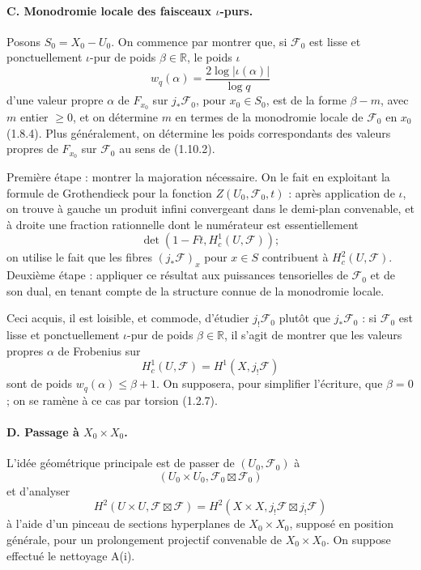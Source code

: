 \documentclass[11pt]{article}
\theoremstyle{remark}
\begin{document}
\paragraph{C. Monodromie locale des faisceaux $\iota$-purs.}
Posons $S_0=X_0-U_0$. On commence par montrer que, si $\mathcal F_0$ est lisse et ponctuellement $\iota$-pur de poids $\beta\in\mathbb R$, le poids $\iota$
\[
w_q(\alpha)=\frac{2\log |\iota(\alpha)|}{\log q}
\]
d'une valeur propre $\alpha$ de $F_{x_0}$ sur $j_*\mathcal F_0$, pour $x_0\in S_0$, est de la forme $\beta-m$, avec $m$ entier $\ge 0$, et on détermine $m$ en termes de la monodromie locale de $\mathcal F_0$ en $x_0$ (1.8.4). Plus généralement, on détermine les poids correspondants des valeurs propres de $F_{x_0}$ sur $\mathcal F_0$ au sens de (1.10.2).

Première étape : montrer la majoration nécessaire. On le fait en exploitant la formule de Grothendieck pour la fonction $Z(U_0,\mathcal F_0,t)$ : après application de $\iota$, on trouve à gauche un produit infini convergeant dans le demi-plan convenable, et à droite une fraction rationnelle dont le numérateur est essentiellement
\[
\det(1-Ft,H^1_c(U,\mathcal F));
\]
on utilise le fait que les fibres $(j_*\mathcal F)_x$ pour $x\in S$ contribuent à $H^2_c(U,\mathcal F)$. Deuxième étape : appliquer ce résultat aux puissances tensorielles de $\mathcal F_0$ et de son dual, en tenant compte de la structure connue de la monodromie locale.

Ceci acquis, il est loisible, et commode, d'étudier $j_!\mathcal F_0$ plutôt que $j_*\mathcal F_0$ : si $\mathcal F_0$ est lisse et ponctuellement $\iota$-pur de poids $\beta\in\mathbb R$, il s'agit de montrer que les valeurs propres $\alpha$ de Frobenius sur
\[
H^1_c(U,\mathcal F)=H^1(X,j_!\mathcal F)
\]
sont de poids $w_q(\alpha)\le \beta+1$. On supposera, pour simplifier l'écriture, que $\beta=0$; on se ramène à ce cas par torsion (1.2.7).

\paragraph{D. Passage à $X_0\times X_0$.}
L'idée géométrique principale est de passer de $(U_0,\mathcal F_0)$ à
\[
(U_0\times U_0,\mathcal F_0\boxtimes\mathcal F_0)
\]
et d'analyser
\[
H^2(U\times U,\mathcal F\boxtimes\mathcal F)
  = H^2(X\times X,j_!\mathcal F\boxtimes j_!\mathcal F)
\]
à l'aide d'un pinceau de sections hyperplanes de $X_0\times X_0$, supposé en position générale, pour un prolongement projectif convenable de $X_0\times X_0$. On suppose effectué le nettoyage A(i).
\end{document}
